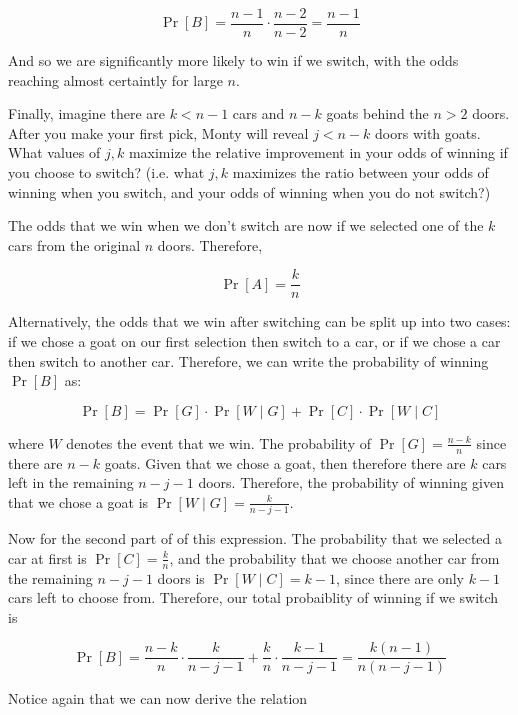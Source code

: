 \documentclass[11pt]{article}
\begin{document}
\begin{Parts}
\begin{solution}
            \[ \Pr[B] = \frac{n-1}{n} \cdot \frac{n-2}{n-2} = \frac{n-1}{n}\] 

            And so we are significantly more likely to win if we switch, with the odds reaching almost certaintly for large $n$.
        \end{solution}
    \Part Finally, imagine there are $k<n-1$ cars and $n-k$ goats behind the
        $n>2$ doors. After you make your first pick, Monty will reveal $j<n-k$
        doors with goats. What values of $j, k$ maximize the relative
        improvement in your odds of winning if you choose to switch? (i.e. what
        $j, k$ maximizes the ratio between your odds of winning when you switch,
        and your odds of winning when you do not switch?)

        \begin{solution}
            The odds that we win when we don't switch are now if we selected one of the $k$ cars from the original $n$ doors. Therefore, 

            \[ \Pr[A] = \frac{k}{n}\] 

            Alternatively, the odds that we win after switching can be split up into two cases: if we chose a goat on our first selection then switch to a car, or if we chose a car then switch to another car. Therefore, we can write the probability of winning $\Pr[B]$ as: 

            \[ \Pr[B] = \Pr[G] \cdot \Pr[W \mid G] + \Pr[C] \cdot \Pr[W\mid C]\]

            where $W$ denotes the event that we win. The probability of $\Pr[G] = \frac{n-k}{n}$ since there are $n-k$ goats. Given that we chose a goat, then therefore there are $k$ cars left in the remaining $n - j - 1$ doors. Therefore, the probability of winning given that we chose a goat is $\Pr[W \mid G] = \frac{k}{n - j - 1}$.

            Now for the second part of of this expression. The probability that we selected a car at first is $\Pr[C] = \frac kn$, and the probability that we choose another car from the remaining $n - j - 1$ doors is $\Pr[W\mid C] = k -1$, since there are only $k-1$ cars left to choose from. Therefore, our total probaiblity of winning if we switch is


            \[ \Pr[B] = \frac{n-k}{n} \cdot \frac{k}{n -j - 1} + \frac{k}{n} \cdot \frac{k-1}{n - j - 1} = \frac{k(n-1)}{n(n - j - 1)} \] 

            Notice again that we can now derive the relation 


\end{solution}
\end{Parts}
\end{document}
